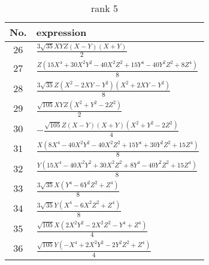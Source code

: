 \documentclass[fleqn,8pt,landscape]{jsarticle}
\begin{document}
\begin{table}[ht!]
\begin{center}
\caption{rank 5}
\renewcommand{\arraystretch}{1.3}
\begin{tabular}{cl} \hline \hline
No. & expression \\ \hline
$ 26 $ & $ \frac{3 \sqrt{35} X Y Z \left(X - Y\right) \left(X + Y\right)}{2} $ \\
$ 27 $ & $ \frac{Z \left(15 X^{4} + 30 X^{2} Y^{2} - 40 X^{2} Z^{2} + 15 Y^{4} - 40 Y^{2} Z^{2} + 8 Z^{4}\right)}{8} $ \\
$ 28 $ & $ \frac{3 \sqrt{35} Z \left(X^{2} - 2 X Y - Y^{2}\right) \left(X^{2} + 2 X Y - Y^{2}\right)}{8} $ \\
$ 29 $ & $ \frac{\sqrt{105} X Y Z \left(X^{2} + Y^{2} - 2 Z^{2}\right)}{2} $ \\
$ 30 $ & $ - \frac{\sqrt{105} Z \left(X - Y\right) \left(X + Y\right) \left(X^{2} + Y^{2} - 2 Z^{2}\right)}{4} $ \\
$ 31 $ & $ \frac{X \left(8 X^{4} - 40 X^{2} Y^{2} - 40 X^{2} Z^{2} + 15 Y^{4} + 30 Y^{2} Z^{2} + 15 Z^{4}\right)}{8} $ \\
$ 32 $ & $ \frac{Y \left(15 X^{4} - 40 X^{2} Y^{2} + 30 X^{2} Z^{2} + 8 Y^{4} - 40 Y^{2} Z^{2} + 15 Z^{4}\right)}{8} $ \\
$ 33 $ & $ \frac{3 \sqrt{35} X \left(Y^{4} - 6 Y^{2} Z^{2} + Z^{4}\right)}{8} $ \\
$ 34 $ & $ \frac{3 \sqrt{35} Y \left(X^{4} - 6 X^{2} Z^{2} + Z^{4}\right)}{8} $ \\
$ 35 $ & $ \frac{\sqrt{105} X \left(2 X^{2} Y^{2} - 2 X^{2} Z^{2} - Y^{4} + Z^{4}\right)}{4} $ \\
$ 36 $ & $ \frac{\sqrt{105} Y \left(- X^{4} + 2 X^{2} Y^{2} - 2 Y^{2} Z^{2} + Z^{4}\right)}{4} $ \\
 \hline \hline
\end{tabular}
\end{center}
\end{table}
\end{document}
